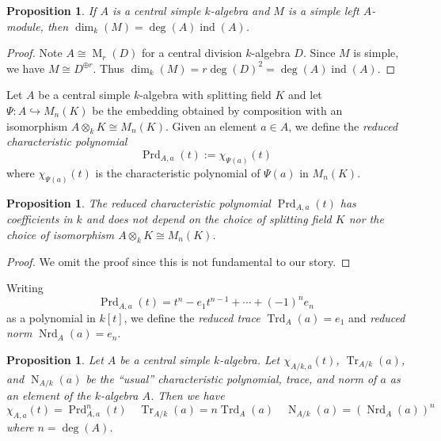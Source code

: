 \documentclass[12pt]{article}
\theoremstyle{plain}
\newtheorem{proposition}[theorem]{Proposition}
\theoremstyle{definition}
\theoremstyle{remark}
\numberwithin{equation}{section}
\begin{document}
\begin{proposition}
If $A$ is a central simple $k$-algebra and
$M$ is a simple left $A$-module, then
$\dim_k(M) =\deg(A) \operatorname{ind}(A)$.
\end{proposition}

\begin{proof}
Note $A \cong \operatorname{M}_r(D)$ for a central division $k$-algebra
$D$.
Since $M$ is simple, we have $M \cong D^{\oplus r}$.
Thus $\dim_k(M) = r \deg(D)^2=\deg(A) \operatorname{ind}(A)$.
\end{proof}

Let $A$ be a central simple $k$-algebra with splitting field $K$
and let $\Psi : A \hookrightarrow M_n(K)$ be the embedding
obtained by composition with an isomorphism $A \otimes_k K \cong
M_n(K)$.
Given an element $a \in A$, we define the
\emph{reduced characteristic polynomial}
\[
\operatorname{Prd}_{A,a}(t) := \chi_{\Psi(a)}(t)
\]
where $\chi_{\Psi(a)}(t)$ is the characteristic polynomial
of $\Psi(a)$ in $M_n(K)$.

\begin{proposition}
The reduced characteristic polynomial
$\operatorname{Prd}_{A,a}(t)$ has coefficients in $k$ and does not depend on
the choice of splitting field $K$ nor the choice of isomorphism
$A \otimes_k K \cong M_n(K)$.
\end{proposition}

\begin{proof}
We omit the proof since this is not fundamental to our story.
\end{proof}

Writing
\[
\operatorname{Prd}_{A,a}(t) = t^n - e_1t^{n-1} + \cdots + (-1)^n e_n
\]
as a polynomial in $k[t]$, we define
the \emph{reduced trace} $\operatorname{Trd}_A(a)=e_1$
and \emph{reduced norm} $\operatorname{Nrd}_A(a)=e_n$.

\begin{proposition}
Let $A$ be a central simple $k$-algebra.
Let $\chi_{A/k,a}(t)$, $\operatorname{Tr}_{A/k}(a)$, and
$\operatorname{N}_{A/k}(a)$
be the ``usual'' characteristic polynomial, trace, and norm
of $a$ as an element of the $k$-algebra $A$.
Then we have
\[
\chi_{A,a}(t)=\operatorname{Prd}_{A,a}^n(t) \quad
\operatorname{Tr}_{A/k}(a)=n\operatorname{Trd}_A(a) \quad
\operatorname{N}_{A/k}(a)=\left(\operatorname{Nrd}_A(a)\right)^n
\]
where $n=\deg(A)$.
\end{proposition}



\end{document}

